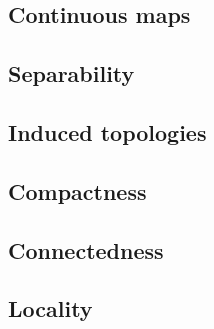 \documentclass[11pt]{article}
\begin{document}




\subsection{Continuous maps}






\subsection{Separability}

\subsection{Induced topologies}


\subsection{Compactness}

\subsection{Connectedness}


\subsection{Locality}


\end{document}
